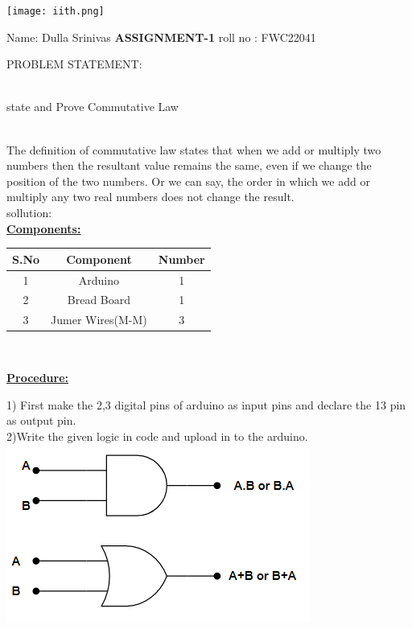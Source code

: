 \documentclass[10pt,a4paper]{report}
\begin{document}
\raggedright \begin{center} \texttt{[image: iith.png]} \end{center}

\vspace{10mm}
\raggedright Name:\hspace{1mm} Dulla Srinivas\hspace{3cm} \textbf{ASSIGNMENT-1}\hspace{4cm} 
roll no :\hspace{1mm} FWC22041\vspace{2cm}
\raggedright PROBLEM STATEMENT:\vspace{2mm}
\raggedright \\ state and Prove Commutative Law
\raggedright \\The definition of commutative law states that when we add or multiply two numbers then the resultant value remains the same, even if we change the position of the two numbers. Or we can say, the order in which we add or multiply any two real numbers does not change the result.
\vspace{1cm}
\\ sollution:
\vspace{5mm}
\\\textbf{\underline{Components:}}\vspace{2mm}
\begin{table}[ht]
\centering %
\begin{tabular}{c c c} %
\hline\hline %
S.No & Component & Number \\ [0.5ex] %
\hline
1 & Arduino & 1 \\
2 & Bread Board & 1 \\
3 & Jumer Wires(M-M) & 3\\
\hline
\end{tabular}
\end{table}

\vspace{5mm}
\\ \raggedright \textbf{\underline{Procedure:}}\vspace{2mm}
\\ \raggedright 1) First make the 2,3 digital pins of arduino as input pins and declare the 13 pin as output pin.
\\ 2)Write the given logic in code and upload in to the arduino.
    \includegraphics{pic.png}
\end{document}
